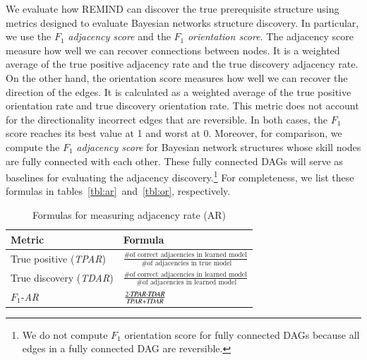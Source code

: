 \documentclass{edm_template}
\begin{document}
{	
	We evaluate how REMIND can discover the true prerequisite structure using metrics designed to evaluate Bayesian networks structure discovery.
	In particular, we use the $F_1$ \emph{adjacency score} and the $F_1$ \emph{orientation score}.
	The adjacency score measure how well we can recover connections between nodes.
	It is a weighted average of the true positive adjacency rate and the true discovery adjacency rate.
	On the other hand, the orientation score measures how well we can recover the direction of the edges.
	It is calculated as a weighted average of the true positive orientation rate and true discovery orientation rate.
	This metric does not account for the directionality incorrect edges that are reversible.
	In both cases, the $F_1$ score reaches its best value at 1 and worst at 0. 
	Moreover, for comparison, we compute the $F_1$ \emph{adjacency score} for Bayesian network structures whose skill nodes are fully connected with each other. 
	These fully connected DAGs will serve as baselines for evaluating the adjacency discovery.\footnote{We do not compute $F_1$ orientation score for fully connected DAGs because all edges in a fully connected DAG are reversible.}
	For completeness, we list these formulas in tables~\ref{tbl:ar}~and~\ref{tbl:or}, respectively.
	
	
	\begin{table}[ht]
		\centering
		\caption{Formulas for measuring adjacency rate (AR) \label{tbl:ar}}
		\label{my-label}
		\begin{tabular}{@{}ll@{}}
			\toprule
			Metric & Formula \\ \midrule
			True positive    (\emph{TPAR}) & $\frac{ \text{\# of correct adjacencies in learned model} } { \text{ \# of adjacencies in true model} }$  \\
			True discovery (\emph{TDAR}) &  $\frac{ \text{\# of correct adjacencies in learned model} } { \text{ \# of adjacencies in learned model} }$ \\
			$F_1$-\textit{AR} &  $\frac{2\cdot \text{\emph{TPAR}} \cdot \text{\emph{TDAR}}} {\text{\emph{TPAR}}+\text{\emph{TDAR}}}$  \\
			\bottomrule
		\end{tabular}
	\end{table}
	
}
\end{document}
